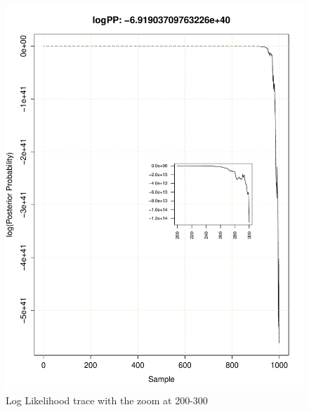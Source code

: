 \documentclass[11pt]{labbook}
\begin{document}
    \begin{figure}
        \centering
        \includegraphics[scale=.75]{FONSE_Plots/2016/June_29/LogLikeTrace_200-300}
        \caption{Log Likelihood trace with the zoom at 200-300}
        \label{fig:JUN29_200-300}
    \end{figure}
\end{document}
